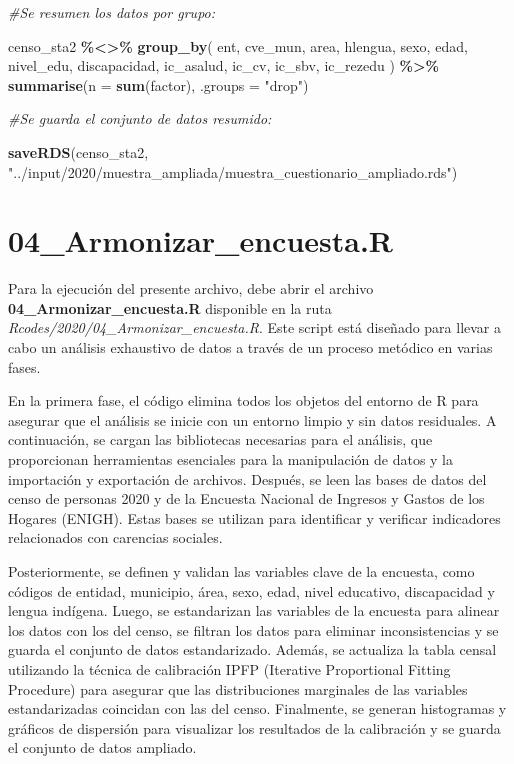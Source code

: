 \documentclass[
  12pt,
]{book}
\newenvironment{Shaded}{\begin{snugshade}}{\end{snugshade}}
\newcommand{\AttributeTok}[1]{\textcolor[rgb]{0.13,0.29,0.53}{#1}}
\newcommand{\CommentTok}[1]{\textcolor[rgb]{0.56,0.35,0.01}{\textit{#1}}}
\newcommand{\FunctionTok}[1]{\textcolor[rgb]{0.13,0.29,0.53}{\textbf{#1}}}
\newcommand{\NormalTok}[1]{#1}
\newcommand{\SpecialCharTok}[1]{\textcolor[rgb]{0.81,0.36,0.00}{\textbf{#1}}}
\newcommand{\StringTok}[1]{\textcolor[rgb]{0.31,0.60,0.02}{#1}}
\begin{document}
\begin{Shaded}
\begin{Highlighting}[]
\CommentTok{\#Se resumen los datos por grupo:}

\NormalTok{censo\_sta2 }\SpecialCharTok{\%\textless{}\textgreater{}\%} \FunctionTok{group\_by}\NormalTok{(}
\NormalTok{  ent,}
\NormalTok{  cve\_mun,}
\NormalTok{  area,}
\NormalTok{  hlengua,}
\NormalTok{  sexo,}
\NormalTok{  edad,}
\NormalTok{  nivel\_edu,}
\NormalTok{  discapacidad,}
\NormalTok{  ic\_asalud,}
\NormalTok{  ic\_cv,}
\NormalTok{  ic\_sbv,}
\NormalTok{  ic\_rezedu}
\NormalTok{) }\SpecialCharTok{\%\textgreater{}\%}
  \FunctionTok{summarise}\NormalTok{(}\AttributeTok{n =} \FunctionTok{sum}\NormalTok{(factor), }\AttributeTok{.groups =} \StringTok{"drop"}\NormalTok{) }

\CommentTok{\#Se guarda el conjunto de datos resumido:}

\FunctionTok{saveRDS}\NormalTok{(censo\_sta2, }\StringTok{"../input/2020/muestra\_ampliada/muestra\_cuestionario\_ampliado.rds"}\NormalTok{)}
\end{Highlighting}
\end{Shaded}

\hypertarget{armonizar_encuesta.r}{%
\chapter*{04\_Armonizar\_encuesta.R}\label{armonizar_encuesta.r}}

Para la ejecución del presente archivo, debe abrir el archivo \textbf{04\_Armonizar\_encuesta.R} disponible en la ruta \emph{Rcodes/2020/04\_Armonizar\_encuesta.R}. Este script está diseñado para llevar a cabo un análisis exhaustivo de datos a través de un proceso metódico en varias fases.

En la primera fase, el código elimina todos los objetos del entorno de R para asegurar que el análisis se inicie con un entorno limpio y sin datos residuales. A continuación, se cargan las bibliotecas necesarias para el análisis, que proporcionan herramientas esenciales para la manipulación de datos y la importación y exportación de archivos. Después, se leen las bases de datos del censo de personas 2020 y de la Encuesta Nacional de Ingresos y Gastos de los Hogares (ENIGH). Estas bases se utilizan para identificar y verificar indicadores relacionados con carencias sociales.

Posteriormente, se definen y validan las variables clave de la encuesta, como códigos de entidad, municipio, área, sexo, edad, nivel educativo, discapacidad y lengua indígena. Luego, se estandarizan las variables de la encuesta para alinear los datos con los del censo, se filtran los datos para eliminar inconsistencias y se guarda el conjunto de datos estandarizado. Además, se actualiza la tabla censal utilizando la técnica de calibración IPFP (Iterative Proportional Fitting Procedure) para asegurar que las distribuciones marginales de las variables estandarizadas coincidan con las del censo. Finalmente, se generan histogramas y gráficos de dispersión para visualizar los resultados de la calibración y se guarda el conjunto de datos ampliado.
\end{document}
